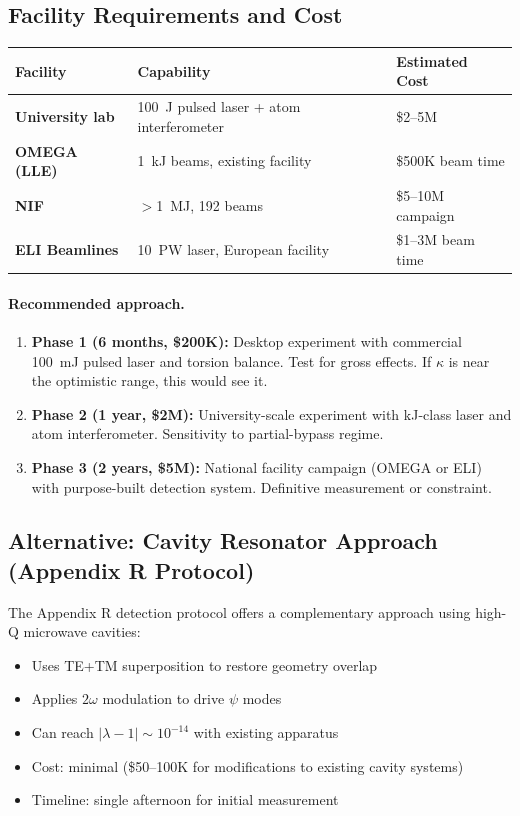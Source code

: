 \documentclass[12pt,a4paper]{article}
\begin{document}
\subsection{Facility Requirements and Cost}

\begin{center}
\begin{tabular}{lll}
\toprule
Facility & Capability & Estimated Cost \\
\midrule
\textbf{University lab} & 100~J pulsed laser + atom interferometer & \$2--5M \\
\textbf{OMEGA (LLE)} & 1~kJ beams, existing facility & \$500K beam time \\
\textbf{NIF} & $>$1~MJ, 192 beams & \$5--10M campaign \\
\textbf{ELI Beamlines} & 10~PW laser, European facility & \$1--3M beam time \\
\bottomrule
\end{tabular}
\end{center}

\paragraph{Recommended approach.}
\begin{enumerate}
\item \textbf{Phase 1 (6 months, \$200K):} Desktop experiment with commercial
  100~mJ pulsed laser and torsion balance.  Test for gross effects.
  If $\kappa$ is near the optimistic range, this would see it.

\item \textbf{Phase 2 (1 year, \$2M):} University-scale experiment with
  kJ-class laser and atom interferometer.  Sensitivity to partial-bypass regime.

\item \textbf{Phase 3 (2 years, \$5M):} National facility campaign (OMEGA or ELI)
  with purpose-built detection system.  Definitive measurement or constraint.
\end{enumerate}

\subsection{Alternative: Cavity Resonator Approach (Appendix R Protocol)}

The Appendix R detection protocol offers a complementary approach using
high-Q microwave cavities:
\begin{itemize}
\item Uses TE+TM superposition to restore geometry overlap
\item Applies $2\omega$ modulation to drive $\psi$ modes
\item Can reach $|\lambda - 1| \sim 10^{-14}$ with existing apparatus
\item Cost: minimal (\$50--100K for modifications to existing cavity systems)
\item Timeline: single afternoon for initial measurement
\end{itemize}
\end{document}
